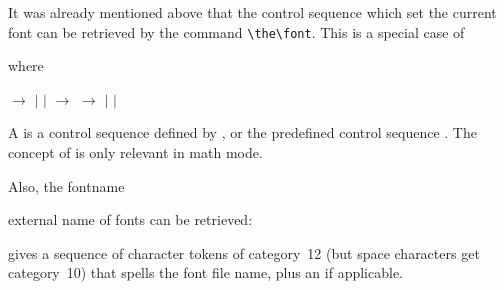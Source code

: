 \documentclass{book}
\begin{document}
It was already mentioned above that the control sequence
which set the current font can be retrieved by the
command \verb>\the\font>. This is a special case of
\begin{Disp}\end{Disp} where
\begin{disp} $\longrightarrow$
 $|$  $|$ \nl
{} $\longrightarrow$
\nl
{} $\longrightarrow$
 $|$  $|$ \end{disp}
A  is a control sequence defined by ,
or the predefined control sequence .
The concept of  is only
relevant in math mode.

Also, the
\cstoidx fontname\par
external name of fonts can be retrieved:
\begin{Disp}\end{Disp}
gives a sequence of character tokens of category~12
(but space characters get category~10) that spells the font file
name, plus an  if applicable.
\end{document}
